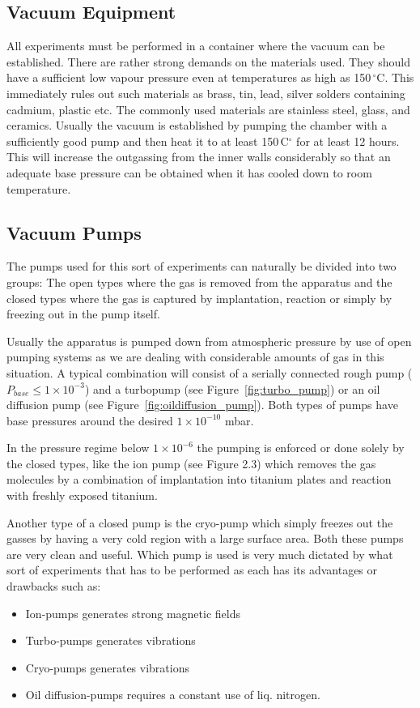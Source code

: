 \subsection{Vacuum Equipment}
All experiments must be performed in a container where the vacuum can be established. There are rather strong demands on the materials used. They should have a sufficient low vapour pressure even at temperatures as high as 150\,$^{\circ}$C. This immediately rules out such materials as brass, tin, lead, silver solders containing cadmium, plastic etc. The commonly used materials are stainless steel, glass, and ceramics. Usually the vacuum is established by pumping the chamber with a sufficiently good pump and then heat it to at least 150\,C$^{\circ}$ for at least 12 hours. This will increase the outgassing from the inner walls considerably so that an adequate base pressure can be obtained when it has cooled down to room temperature.

\subsection{Vacuum Pumps}
The pumps used for this sort of experiments can naturally be divided into two groups: The open types where the gas is removed from the apparatus and the closed types where the gas is captured by implantation, reaction or simply by freezing out in the pump itself.

Usually the apparatus is pumped down from atmospheric pressure by use of open pumping systems as we are dealing with considerable amounts of gas in this situation. A typical combination will consist of a serially connected rough pump ($P_{base} \leq 1 \times 10^{-3}$) and a turbopump (see Figure~\ref{fig:turbo_pump}) or an oil diffusion pump (see Figure~\ref{fig:oildiffusion_pump}). Both types of pumps have base pressures around the desired $1 \times 10^{-10}$ mbar.

In the pressure regime below $1 \times 10^{-6}$ the pumping is enforced or done solely by the closed types, like the ion pump (see Figure 2.3) which removes the gas molecules by a combination of implantation into titanium plates and reaction with freshly exposed titanium.

Another type of a closed pump is the cryo-pump which simply freezes out the gasses by having a very cold region with a large surface area. Both these pumps are very clean and useful. Which pump is used is very much dictated by what sort of experiments that has to be performed as each has its advantages or drawbacks such as:
\begin{itemize} 
\item Ion-pumps \dotfill generates strong magnetic fields
\item Turbo-pumps \dotfill generates vibrations
\item Cryo-pumps \dotfill generates vibrations
\item Oil diffusion-pumps \dotfill requires a constant use of liq. nitrogen.
\end{itemize}

